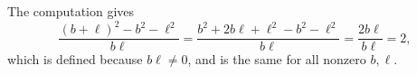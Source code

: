 The computation gives
\[\dfrac{(b+\ell)^2-b^2-\ell^2}{b\ell}=\dfrac{b^2+2b\ell+\ell^2-b^2-\ell^2}{b\ell}=\dfrac{2b\ell}{b\ell}=\boxed{2},\]
which is defined because $b\ell\ne0$, and is the same for all nonzero $b,\ell$.
